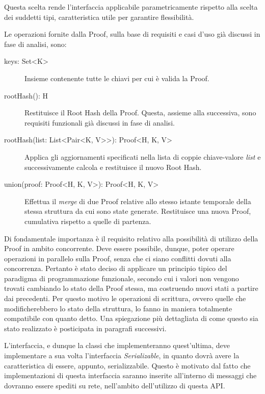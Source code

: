 		Questa scelta rende l'interfaccia applicabile parametricamente rispetto alla scelta dei suddetti tipi, caratteristica utile per garantire flessibilità. 
		
		Le operazioni fornite dalla Proof, sulla base di requisiti e casi d'uso già discussi in fase di analisi, sono:
		
		\begin{description}
			\item[keys: Set<K>] Insieme contenente tutte le chiavi per cui è valida la Proof.
			\item[rootHash(): H] Restituisce il Root Hash della Proof. Questa, assieme alla successiva, sono requisiti funzionali già discussi in fase di analisi.
			\item[rootHash(list: List<Pair<K, V>{}>): Proof<H, K, V>] Applica gli aggiornamenti specificati nella lista di coppie chiave-valore \textit{list} e successivamente calcola e restituisce il nuovo Root Hash.
			\item[union(proof: Proof<H, K, V>): Proof<H, K, V>] Effettua il \textit{merge} di due Proof relative allo stesso istante temporale della stessa struttura da cui sono state generate. Restituisce una nuova Proof, cumulativa rispetto a quelle di partenza.
		\end{description}
		
		Di fondamentale importanza è il requisito relativo alla possibilità di utilizzo della Proof in ambito concorrente. Deve essere possibile, dunque, poter operare operazioni in parallelo sulla Proof, senza che ci siano conflitti dovuti alla concorrenza. Pertanto è stato deciso di applicare un principio tipico del paradigma di programmazione funzionale, secondo cui i valori non vengono trovati cambiando lo stato della Proof stessa, ma costruendo nuovi stati a partire dai precedenti. Per questo motivo le operazioni di scrittura, ovvero quelle che modificherebbero lo stato della struttura, lo fanno in maniera totalmente compatibile con quanto detto. Una spiegazione più dettagliata di come questo sia stato realizzato è posticipata in paragrafi successivi.
		
		L'interfaccia, e dunque la classi che implementeranno quest'ultima, deve implementare a sua volta l'interfaccia \textit{Serializable}, in quanto dovrà avere la caratteristica di essere, appunto, serializzabile. Questo è motivato dal fatto che implementazioni di questa interfaccia saranno inserite all'interno di messaggi che dovranno essere spediti su rete, nell'ambito dell'utilizzo di questa API.
	
